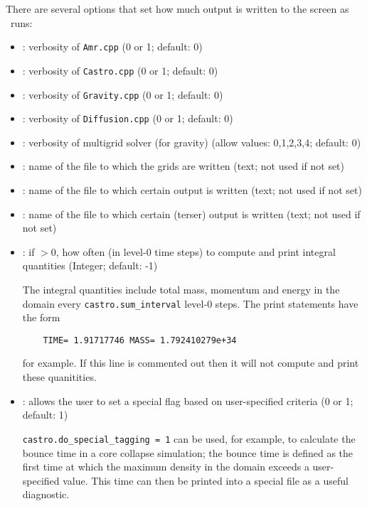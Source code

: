 There are several options that set how much output is written to the
screen as \castro\ runs:
\begin{itemize}
\item {}: verbosity of {\tt Amr.cpp} (0 or 1; default: 0)

\item {}: verbosity of {\tt Castro.cpp} (0 or 1; default: 0)

\item {}: verbosity of {\tt Gravity.cpp} (0 or 1; default: 0)
  
\item {}: verbosity of {\tt Diffusion.cpp} (0 or 1;
  default: 0)
  
\item {}: verbosity of multigrid solver (for gravity) (allow
  values: 0,1,2,3,4; default: 0)
  
\item {}: name of the file to which the grids are
  written (text; not used if not set)
  
\item {}: name of the file to which certain output is
  written (text; not used if not set)
  
\item {}: name of the file to which certain
  (terser) output is written (text; not used if not set)
  
\item {}: if $> 0$, how often (in level-0 time
  steps) to compute and print integral quantities (Integer; default: -1)

  The integral quantities include total mass, momentum and energy in
  the domain every {\tt castro.sum\_interval} level-0 steps.
  The print statements have the form
  \begin{verbatim}
    TIME= 1.91717746 MASS= 1.792410279e+34
  \end{verbatim}
  for example.  If this line is commented out then
  it will not compute and print these quanitities.

  
\item {}: allows the user to set a
  special flag based on user-specified criteria (0 or 1; default: 1)

  {\tt castro.do\_special\_tagging = 1} can be used, for example, to
  calculate the bounce time in a core collapse simulation; the bounce
  time is defined as the first time at which the maximum density in
  the domain exceeds a user-specified value.  This time can then be
  printed into a special file as a useful diagnostic.
\end{itemize}

